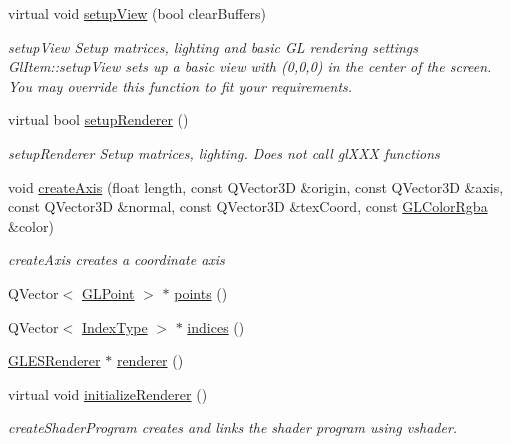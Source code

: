 \begin{DoxyCompactItemize}
virtual void \mbox{\hyperlink{class_g_l_item_a3b5a6427cdafb5adb6aeef1c644bb933}{setup\+View}} (bool clear\+Buffers)
\begin{DoxyCompactList}\small\item\em setup\+View Setup matrices, lighting and basic GL rendering settings Gl\+Item\+::setup\+View sets up a basic view with (0,0,0) in the center of the screen. You may override this function to fit your requirements. \end{DoxyCompactList}\item 
virtual bool \mbox{\hyperlink{class_g_l_item_a026f429130712bff4517c1cf9af910fd}{setup\+Renderer}} ()
\begin{DoxyCompactList}\small\item\em setup\+Renderer Setup matrices, lighting. Does not call gl\+X\+XX functions \end{DoxyCompactList}\item 
void \mbox{\hyperlink{class_g_l_item_a2153cac833846fcd3b8b507bff244406}{create\+Axis}} (float length, const Q\+Vector3D \&origin, const Q\+Vector3D \&axis, const Q\+Vector3D \&normal, const Q\+Vector3D \&tex\+Coord, const \mbox{\hyperlink{class_g_l_color_rgba}{G\+L\+Color\+Rgba}} \&color)
\begin{DoxyCompactList}\small\item\em create\+Axis creates a coordinate axis \end{DoxyCompactList}\item 
Q\+Vector$<$ \mbox{\hyperlink{class_g_l_point}{G\+L\+Point}} $>$ $\ast$ \mbox{\hyperlink{class_g_l_item_a30a7ce7ab52ac63010cc3f692406b259}{points}} ()
\item 
Q\+Vector$<$ \mbox{\hyperlink{gldefines_8h_af3c748960f29c42e5b7f1dc449ab66ff}{Index\+Type}} $>$ $\ast$ \mbox{\hyperlink{class_g_l_item_ab14e096f79b7499d20e9cbcf69bf181a}{indices}} ()
\item 
\mbox{\hyperlink{class_g_l_e_s_renderer}{G\+L\+E\+S\+Renderer}} $\ast$ \mbox{\hyperlink{class_g_l_item_a4575b8c146849022b567a75b4f9cfa8e}{renderer}} ()
\item 
virtual void \mbox{\hyperlink{class_g_l_item_aa77a50c3152b78113ba43752d20211f5}{initialize\+Renderer}} ()
\begin{DoxyCompactList}\small\item\em create\+Shader\+Program creates and links the shader program using vshader. \end{DoxyCompactList}\end{DoxyCompactItemize}
